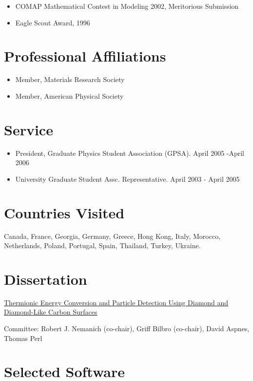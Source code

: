 \begin{itemize}
\item
  COMAP Mathematical Contest in Modeling 2002, Meritorious Submission
\item
  Eagle Scout Award, 1996
\end{itemize}

\section{Professional Affiliations}

\begin{itemize}
\item
  Member, Materials Research Society
\item
  Member, American Physical Society
\end{itemize}

\section{Service}

\begin{itemize}
\item
  President, Graduate Physics Student Association (GPSA). April 2005
  -April 2006
\item
  University Graduate Student Assc. Representative. April 2003 - April
  2005
\end{itemize}

\section{Countries Visited}

Canada, France, Georgia, Germany, Greece, Hong Kong, Italy, Morocco,
Netherlands, Poland, Portugal, Spain, Thailand, Turkey, Ukraine.

\section{Dissertation}

\href{http://www.lib.ncsu.edu/resolver/1840.16/3107}{Thermionic Energy
Conversion and Particle Detection Using Diamond and Diamond-Like Carbon
Surfaces}

Committee: Robert J. Nemanich (co-chair), Griff Bilbro (co-chair), David
Aspnes, Thomas Perl

\section{Selected Software}

